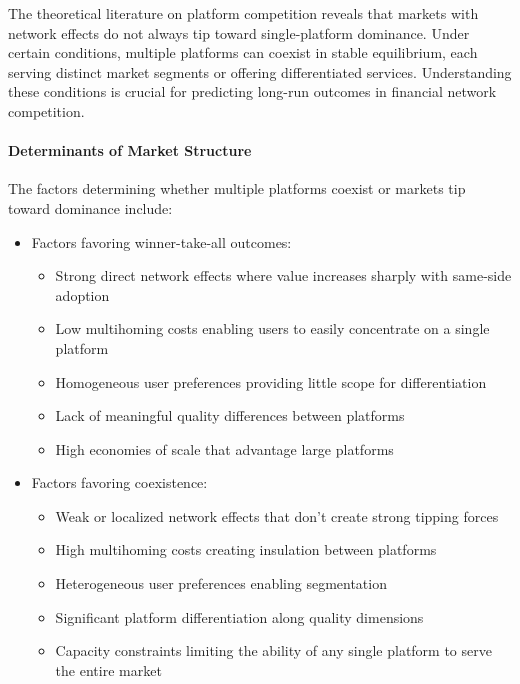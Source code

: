 The theoretical literature on platform competition reveals that markets with network effects do not always tip toward single-platform dominance. Under certain conditions, multiple platforms can coexist in stable equilibrium, each serving distinct market segments or offering differentiated services. Understanding these conditions is crucial for predicting long-run outcomes in financial network competition.

\paragraph{Determinants of Market Structure}

The factors determining whether multiple platforms coexist or markets tip toward dominance include:

\begin{itemize}
    \item Factors favoring winner-take-all outcomes:
    \begin{itemize}
        \item Strong direct network effects where value increases sharply with same-side adoption
        \item Low multihoming costs enabling users to easily concentrate on a single platform
        \item Homogeneous user preferences providing little scope for differentiation
        \item Lack of meaningful quality differences between platforms
        \item High economies of scale that advantage large platforms
    \end{itemize}
    
    \item Factors favoring coexistence:
    \begin{itemize}
        \item Weak or localized network effects that don't create strong tipping forces
        \item High multihoming costs creating insulation between platforms
        \item Heterogeneous user preferences enabling segmentation
        \item Significant platform differentiation along quality dimensions
        \item Capacity constraints limiting the ability of any single platform to serve the entire market
    \end{itemize}
\end{itemize}

